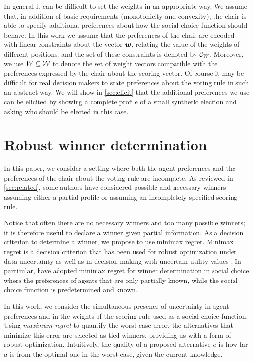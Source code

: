 \documentclass{article}
\begin{document}
In general it can be difficult to set the weights in an appropriate way.
We assume that, in addition of basic requirements (monotonicity and convexity), the chair is able to specify additional preferences about how the social choice function should behave.
In this work we assume that the preferences of the chair are encoded with linear constraints about the vector $\bm{w}$, relating the value of the weights of different positions, and the set of these constraints is denoted by $\mathcal{C}_W$. Moreover, we use $W \subseteq \mathcal{W}$ to denote the set of weight vectors compatible with the preferences expressed by the chair about the scoring vector.
Of course it may be difficult for real decision makers to state preferences about the voting rule in such an abstract way.
We will show in \cref{sec:elicit} that the additional preferences we use can be elicited by 
showing a complete profile of a small synthetic election and asking who should be elected in this case.

\section{Robust winner determination}
\label{sec:mmr}
In this paper, we consider a setting where both the agent preferences and the preferences of the chair about the voting rule are incomplete.
As reviewed in \cref{sec:related}, some authors have considered possible and necessary winners assuming 
either a partial profile or assuming an incompletely specified scoring rule.

Notice that often there are no necessary winners and too many possible winners; it is therefore useful to declare a winner given partial information.
As a decision criterion to determine a winner, we propose to use minimax regret. 
Minimax regret \citep{Savage1954} is a decision criterion that has been used for robust optimization under data uncertainty \citep{Kouvelis1997} as well as in decision-making with uncertain utility values \citep{Salo2001,Boutilier2006}.
In particular, \citet{Lu2011} have adopted minimax regret for winner determination in social choice where
the preferences of agents that are only partially known, while the social choice function is predetermined and known.

In this work, we consider the simultaneous presence of uncertainty in agent preferences and in the weights of the scoring rule used as a social choice function.
Using {\em maximum regret} to quantify the worst-case error, the alternatives that minimize this error are selected as tied winners, providing us with a form of robust optimization.
Intuitively, the quality of a proposed alternative $a$ is how far $a$ is from the optimal one in the worst case, given the current knowledge.
\end{document}

